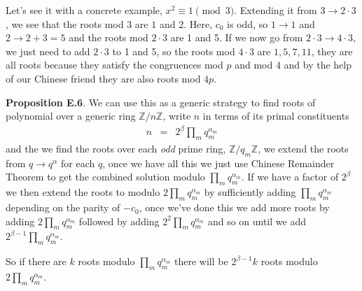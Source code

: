\documentclass[aps,preprint,preprintnumbers,nofootinbib,showpacs,prd]{revtex4-1}
\newcommand{\nbea}{\begin{eqnarray*}}
\newcommand{\neea}{\end{eqnarray*}}
\begin{document}
Let's see it with a concrete example, $x^2 \equiv 1 \pmod{3}$. Extending it from $3 \to 2\cdot 3$, we see that the roots mod 3 are $1$ and $2$. Here, $c_0$ is odd, so $1 \to 1$ and $2 \to 2+3 = 5$ and the roots mod $2\cdot 3$ are 1 and 5. If we now go from $2\cdot 3 \to 4\cdot 3$, we just need to add $2\cdot 3$ to 1 and 5, so the roots mod $4\cdot 3$ are $1, 5, 7, 11$, they are all roots because they satisfy the congruences mod $p$ and mod $4$ and by the help of our Chinese friend they are also roots mod $4p$.

{\bf Proposition E.6}. We can use this as a generic strategy to find roots of polynomial over a generic ring $\mathbb{Z}/n\mathbb{Z}$, write $n$ in terms of its primal constituents 
%
\nbea
n & = & 2^\beta \prod_m q_m^{\alpha_m}
\neea
%
and the we find the roots over each {\it odd} prime ring, $\mathbb{Z}/q_m\mathbb{Z}$, we extend the roots from $q \to q^{\alpha}$ for each $q$, once we have all this we just use Chinese Remainder Theorem to get the combined solution modulo $\prod_m q_m^{\alpha_m}$. If we have a factor of $2^\beta$ we then extend the roots to modulo $2\prod_m q_m^{\alpha_m}$ by sufficiently adding $\prod_m q_m^{\alpha_m}$ depending on the parity of $-c_0$, once we've done this we add more roots by adding $2\prod_m q_m^{\alpha_m}$ followed by adding $2^2\prod_m q_m^{\alpha_m}$ and so on until we add $2^{\beta-1}\prod_m q_m^{\alpha_m}$.

So if there are $k$ roots modulo $\prod_m q_m^{\alpha_m}$ there will be $2^{\beta-1} k$ roots modulo $2\prod_m q_m^{\alpha_m}$.
\end{document}
